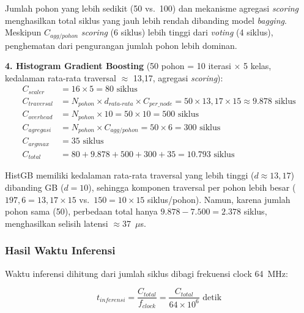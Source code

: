 Jumlah pohon yang lebih sedikit (50 vs.\ 100) dan mekanisme agregasi \textit{scoring} menghasilkan total siklus yang jauh lebih rendah dibanding model \textit{bagging}. Meskipun $C_{agg/pohon}$ \textit{scoring} (6 siklus) lebih tinggi dari \textit{voting} (4 siklus), penghematan dari pengurangan jumlah pohon lebih dominan.

\textbf{4. Histogram Gradient Boosting} (50 pohon = 10 iterasi $\times$ 5 kelas, kedalaman rata-rata traversal $\approx$ 13,17, agregasi \textit{scoring}):
\begin{align}
    C_{scaler} &= 16 \times 5 = 80 \text{ siklus} \nonumber \\
    C_{traversal} &= N_{pohon} \times d_{rata\text{-}rata} \times C_{per\_node} = 50 \times 13{,}17 \times 15 \approx 9.878 \text{ siklus} \nonumber \\
    C_{overhead} &= N_{pohon} \times 10 = 50 \times 10 = 500 \text{ siklus} \nonumber \\
    C_{agregasi} &= N_{pohon} \times C_{agg/pohon} = 50 \times 6 = 300 \text{ siklus} \nonumber \\
    C_{argmax} &= 35 \text{ siklus} \nonumber \\
    C_{total} &= 80 + 9.878 + 500 + 300 + 35 = \mathbf{10.793} \text{ siklus} \nonumber
\end{align}

HistGB memiliki kedalaman rata-rata traversal yang lebih tinggi ($d \approx 13{,}17$) dibanding GB ($d = 10$), sehingga komponen traversal per pohon lebih besar ($197{,}6 = 13{,}17 \times 15$ vs.\ $150 = 10 \times 15$ siklus/pohon). Namun, karena jumlah pohon sama (50), perbedaan total hanya $9.878 - 7.500 = 2.378$ siklus, menghasilkan selisih latensi $\approx$37~$\mu$s.

\subsubsection{Hasil Waktu Inferensi}

Waktu inferensi dihitung dari jumlah siklus dibagi frekuensi clock 64~MHz:

\begin{equation}
    t_{inferensi} = \frac{C_{total}}{f_{clock}} = \frac{C_{total}}{64 \times 10^6} \text{ detik}
\end{equation}

